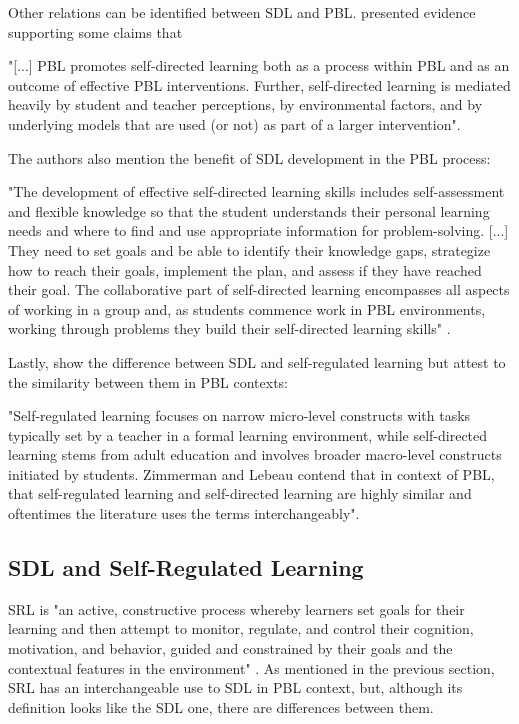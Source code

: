Other relations can be identified between \gls{SDL} and \gls{PBL}.  presented evidence supporting some claims that
\begin{citacao}
    "[...] PBL promotes self-directed learning both as a process within PBL and as an outcome of effective PBL interventions. Further, self-directed learning is mediated heavily by student and teacher perceptions, by environmental factors, and by underlying models that are used (or not) as part of a larger intervention".
\end{citacao}
The authors also mention the benefit of \gls{SDL} development in the \gls{PBL} process:
\begin{citacao}
    "The development of effective self-directed learning skills includes self-assess\-ment and flexible knowledge so that the student understands their personal learning needs and where to find and use appropriate information for problem-solving. [...] They need to set goals and be able to identify their knowledge gaps, strategize how to reach their goals, implement the plan, and assess if they have reached their goal. The collaborative part of self-directed learning encompasses all aspects of working in a group and, as students commence work in PBL environments, working through problems they build their self-directed learning skills" \cite[p.~188]{leary:2019}.
\end{citacao}
Lastly,  show the difference between \gls{SDL} and self-regulated learning but attest to the similarity between them in \gls{PBL} contexts:
\begin{citacao}
    "Self-regulated learning focuses on narrow micro-level constructs with tasks typically set by a teacher in a formal learning environment, while self-directed learning stems from adult education and involves broader macro-level constructs initiated by students. Zimmerman and Lebeau contend that in context of PBL, that self-regulated learning and self-directed learning are highly similar and oftentimes the literature uses the terms interchangeably".
\end{citacao}


\subsection{SDL and Self-Regulated Learning}
\label{sdl-relations-ss:srl}

\gls{SRL} is "an active, constructive process whereby learners set goals for their learning and then attempt to monitor, regulate, and control their cognition, motivation, and behavior, guided and constrained by their goals and the contextual features in the environment" \cite[p.~453]{pintrich:2000}. As mentioned in the previous section, \gls{SRL} has an interchangeable use to \gls{SDL} in \gls{PBL} context, but, although its definition looks like the \gls{SDL} one, there are differences between them.

